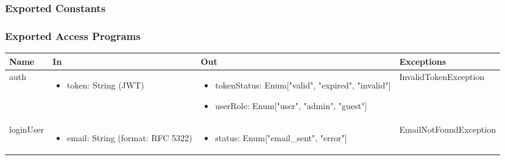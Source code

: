 \documentclass[12pt, titlepage]{article}
\begin{document}
\subsubsection{Exported Constants}

\subsubsection{Exported Access Programs}

\begin{center}
  \begin{tabular}{p{2cm} p{4cm} p{2cm} p{4cm}}
  \hline
  \textbf{Name} & \textbf{In} & \textbf{Out} & \textbf{Exceptions} \\
  \hline
  auth & 
  \begin{minipage}{3.5cm}
  \vspace{-0.2cm}
  \begin{itemize}[leftmargin=*,noitemsep]
    \item token: String (JWT)
  \end{itemize}
  \end{minipage} & 
  \begin{minipage}{3.5cm}
  \vspace{-0.2cm}
  \begin{itemize}[leftmargin=*,noitemsep]
    \item tokenStatus: Enum["valid", "expired", "invalid"]
    \item userRole: Enum["user", "admin", "guest"]
  \end{itemize}
  \end{minipage} & 
  InvalidTokenException \\
  \hline
  loginUser & 
  \begin{minipage}{3.5cm}
  \vspace{-0.2cm}
  \begin{itemize}[leftmargin=*,noitemsep]
    \item email: String (format: RFC 5322)
  \end{itemize}
  \end{minipage} & 
  \begin{minipage}{3.5cm}
  \vspace{-0.2cm}
  \begin{itemize}[leftmargin=*,noitemsep]
    \item status: Enum["email\_sent", "error"]
  \end{itemize}
  \end{minipage} & 
  EmailNotFoundException \\

\end{tabular}
\end{center}
\end{document}
